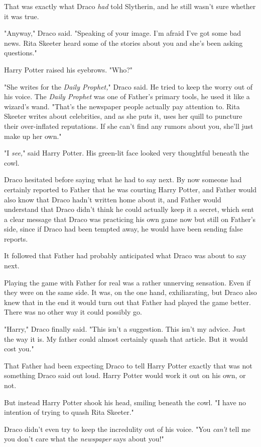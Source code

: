 That was exactly what Draco \emph{had} told Slytherin, and he still wasn't sure
whether it was true.

"Anyway," Draco said. "Speaking of your image. I'm afraid I've got some bad
news. Rita Skeeter heard some of the stories about you and she's been asking
questions."

Harry Potter raised his eyebrows. "Who?"

"She writes for the \emph{Daily Prophet,}" Draco said. He tried to keep the
worry out of his voice. The \emph{Daily Prophet} was one of Father's primary
tools, he used it like a wizard's wand. "That's the newspaper people actually
pay attention to. Rita Skeeter writes about celebrities, and as she puts it,
uses her quill to puncture their over-inflated reputations. If she can't find
any rumors about you, she'll just make up her own."

"I \emph{see,}" said Harry Potter. His green-lit face looked very thoughtful
beneath the cowl.

Draco hesitated before saying what he had to say next. By now someone had
certainly reported to Father that he was courting Harry Potter, and Father
would also know that Draco hadn't written home about it, and Father would
understand that Draco didn't think he could actually keep it a secret, which
sent a clear message that Draco was practicing his own game now but still on
Father's side, since if Draco had been tempted away, he would have been sending
false reports.

It followed that Father had probably anticipated what Draco was about to say
next.

Playing the game with Father for real was a rather unnerving sensation. Even if
they were on the same side. It was, on the one hand, exhiliarating, but Draco
also knew that in the end it would turn out that Father had played the game
better. There was no other way it could possibly go.

"Harry," Draco finally said. "This isn't a suggestion. This isn't my advice.
Just the way it is. My father could almost certainly quash that article. But it
would cost you."

That Father had been expecting Draco to tell Harry Potter exactly that was not
something Draco said out loud. Harry Potter would work it out on his own, or
not.

But instead Harry Potter shook his head, smiling beneath the cowl. "I have no
intention of trying to quash Rita Skeeter."

Draco didn't even try to keep the incredulity out of his voice. "You
\emph{can't} tell me you don't care what the \emph{newspaper} says about you!"

